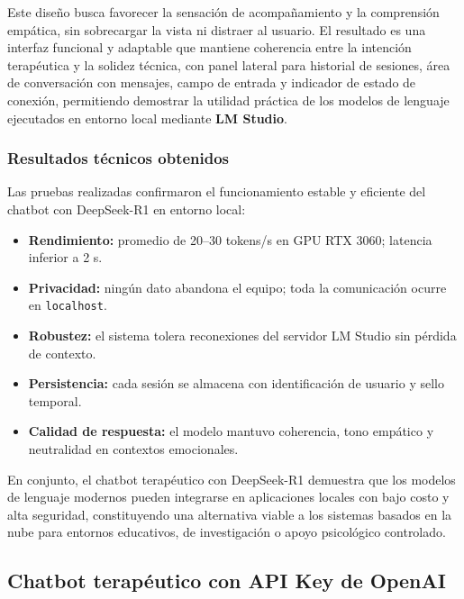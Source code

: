 \documentclass[12pt,a4paper]{report}
\numberwithin{figure}{section}
\begin{document}
Este diseño busca favorecer la sensación de acompañamiento y la comprensión empática, sin sobrecargar la vista ni distraer al usuario. El resultado es una interfaz funcional y adaptable que mantiene coherencia entre la intención terapéutica y la solidez técnica, con panel lateral para historial de sesiones, área de conversación con mensajes, campo de entrada y indicador de estado de conexión, permitiendo demostrar la utilidad práctica de los modelos de lenguaje ejecutados en entorno local mediante \textbf{LM Studio}.

\subsubsection{Resultados técnicos obtenidos}
\label{subsubsec:resultados_local}

Las pruebas realizadas confirmaron el funcionamiento estable y eficiente del chatbot con DeepSeek-R1 en entorno local:

\begin{itemize}
    \item \textbf{Rendimiento:} promedio de 20–30 tokens/s en GPU RTX 3060; latencia inferior a 2 s.
    \item \textbf{Privacidad:} ningún dato abandona el equipo; toda la comunicación ocurre en \texttt{localhost}.
    \item \textbf{Robustez:} el sistema tolera reconexiones del servidor LM Studio sin pérdida de contexto.
    \item \textbf{Persistencia:} cada sesión se almacena con identificación de usuario y sello temporal.
    \item \textbf{Calidad de respuesta:} el modelo mantuvo coherencia, tono empático y neutralidad en contextos emocionales.
\end{itemize}

En conjunto, el chatbot terapéutico con DeepSeek-R1 demuestra que los modelos de lenguaje modernos pueden integrarse en aplicaciones locales con bajo costo y alta seguridad, constituyendo una alternativa viable a los sistemas basados en la nube para entornos educativos, de investigación o apoyo psicológico controlado.

\subsection{Chatbot terapéutico con API Key de OpenAI}
\label{subsec:chatbot_openai}
\end{document}
